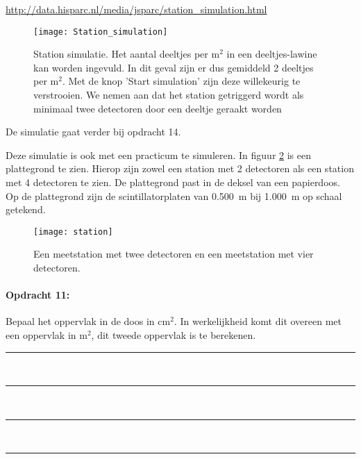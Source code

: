 \url{http://data.hisparc.nl/media/jsparc/station_simulation.html}

\begin{figure}[H]
\texttt{[image: Station\_simulation]}

\caption{\label{fig:Station_simulatie}Station simulatie. Het aantal deeltjes
per m$^{2}$ in een deeltjes-lawine kan worden ingevuld. In dit geval zijn er
dus gemiddeld 2 deeltjes per m$^{2}$. Met de knop 'Start simulation' zijn deze
willekeurig te verstrooien. We nemen aan dat het station getriggerd wordt als
minimaal twee detectoren door een deeltje geraakt worden}

\end{figure}


De simulatie gaat verder bij opdracht 14.

Deze simulatie is ook met een practicum te simuleren. In
figuur \ref{fig:Meetstations} is een plattegrond te zien. Hierop
zijn zowel een station met 2 detectoren als een station met 4 detectoren
te zien. De plattegrond past in de deksel van een papierdoos. Op de
plattegrond zijn de scintillatorplaten van \SI{0.500}{\meter} bij
\SI{1.000}{\meter} op schaal getekend.

\begin{figure}[h]
    \centering
    \texttt{[image: station]}
    \caption{Een meetstation met twee detectoren en een
    meetstation met vier detectoren.}
    \label{fig:Meetstations}
\end{figure}

\begin{minipage}[t]{\columnwidth}%

\paragraph{Opdracht 11:}

Bepaal het oppervlak in de doos in $\mathrm{cm^{2}}$. In
werkelijkheid komt dit overeen met een oppervlak in $\mathrm{m^{2}}$,
dit tweede oppervlak is te berekenen.

\begin{center}
    \rule{\textwidth}{0.3mm}\\
    \rule{\textwidth}{0.3mm}\\
    \rule{\textwidth}{0.3mm}\\
    \rule{\textwidth}{0.3mm}\\
\end{center}
\end{minipage}\bigskip{}

